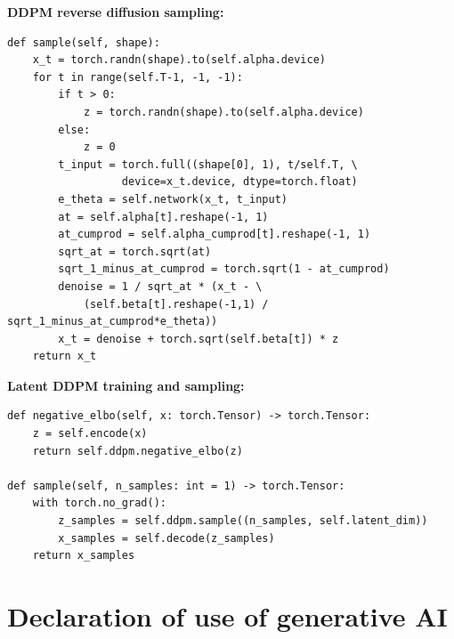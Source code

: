 \documentclass[10pt,a4paper]{article}
\begin{document}
\textbf{DDPM reverse diffusion sampling:}
\begin{lstlisting}
def sample(self, shape):
    x_t = torch.randn(shape).to(self.alpha.device)
    for t in range(self.T-1, -1, -1):
        if t > 0:
            z = torch.randn(shape).to(self.alpha.device)
        else:
            z = 0
        t_input = torch.full((shape[0], 1), t/self.T, \
                  device=x_t.device, dtype=torch.float)
        e_theta = self.network(x_t, t_input)
        at = self.alpha[t].reshape(-1, 1)
        at_cumprod = self.alpha_cumprod[t].reshape(-1, 1)
        sqrt_at = torch.sqrt(at)
        sqrt_1_minus_at_cumprod = torch.sqrt(1 - at_cumprod)
        denoise = 1 / sqrt_at * (x_t - \
            (self.beta[t].reshape(-1,1) / sqrt_1_minus_at_cumprod*e_theta))
        x_t = denoise + torch.sqrt(self.beta[t]) * z
    return x_t
\end{lstlisting}

\textbf{Latent DDPM training and sampling:}
\begin{lstlisting}
def negative_elbo(self, x: torch.Tensor) -> torch.Tensor:
    z = self.encode(x)
    return self.ddpm.negative_elbo(z)

def sample(self, n_samples: int = 1) -> torch.Tensor:
    with torch.no_grad():
        z_samples = self.ddpm.sample((n_samples, self.latent_dim))
        x_samples = self.decode(z_samples)
    return x_samples
\end{lstlisting}

\newpage



\section*{Declaration of use of generative AI}
\end{document}
